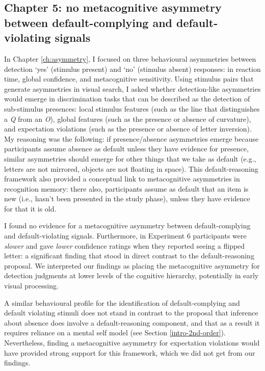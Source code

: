 \documentclass[12pt,twoside]{reedthesis}
\begin{document}
\hypertarget{chapter-5-no-metacognitive-asymmetry-between-default-complying-and-default-violating-signals}{%
\subsection*{Chapter 5: no metacognitive asymmetry between default-complying and default-violating signals}\label{chapter-5-no-metacognitive-asymmetry-between-default-complying-and-default-violating-signals}}

In Chapter \ref{ch:asymmetry}, I focused on three behavioural asymmetries between detection `yes' (stimulus present) and `no' (stimulus absent) responses: in reaction time, global confidence, and metacognitive sensitivity. Using stimulus pairs that generate asymmetries in visual search, I asked whether detection-like asymmetries would emerge in discrimination tasks that can be described as the detection of sub-stimulus presences: local stimulus features (such as the line that distinguishes a \emph{Q} from an \emph{O}), global features (such as the presence or absence of curvature), and expectation violations (such as the presence or absence of letter inversion). My reasoning was the following: if presence/absence asymmetries emerge because participants assume absence as default unless they have evidence for presence, similar asymmetries should emerge for other things that we take as default (e.g., letters are not mirrored, objects are not floating in space). This default-reasoning framework also provided a conceptual link to metacognitive asymmetries in recognition memory: there also, participants assume as default that an item is new (i.e., hasn't been presented in the study phase), unless they have evidence for that it is old.

I found no evidence for a metacognitive asymmetry between default-complying and default-violating signals. Furthermore, in Experiment 6 participants were \emph{slower} and gave \emph{lower} confidence ratings when they reported seeing a flipped letter: a significant finding that stood in direct contrast to the default-reasoning proposal. We interpreted our findings as placing the metacognitive asymmetry for detection judgments at lower levels of the cognitive hierarchy, potentially in early visual processing.

A similar behavioural profile for the identification of default-complying and default violating stimuli does not stand in contrast to the proposal that inference about absence does involve a default-reasoning component, and that as a result it requires reliance on a mental self model (see Section \ref{intro-2nd-order}). Nevertheless, finding a metacognitive asymmetry for expectation violations would have provided strong support for this framework, which we did not get from our findings.
\end{document}

